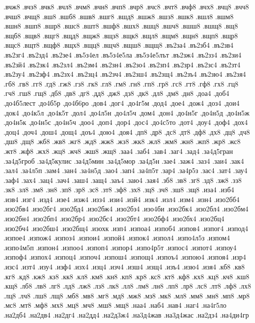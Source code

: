 {.вчж8
.вчз8
.вчк8
.вчл8
.вчм8
.вчн8
.вчп8
.вчр8
.вчс8
.вчт8
.вчф8
.вчх8
.вчц8
.вчч8
.вчш8
.вчщ8
.вш8
.вшб8
.вшв8
.вшг8
.вшд8
.вшж8
.вшз8
.вшк8
.вшл8
.вшм8
.вшн8
.вшп8
.вшр8
.вшс8
.вшт8
.вшф8
.вшх8
.вшц8
.вшч8
.вшш8
.вшщ8
.вщ8
.вщб8
.вщв8
.вщг8
.вщд8
.вщж8
.вщз8
.вщк8
.вщл8
.вщм8
.вщн8
.вщп8
.вщр8
.вщс8
.вщт8
.вщф8
.вщх8
.вщц8
.вщч8
.вщш8
.вщщ8
.въ2за4
.въ2зб4
.въ2зв4
.въ2зг4
.въ2зд4
.въ2зе4
.въ5з4ел
.въ5з4е5ла
.въ5з4е5лът
.въ2зж4
.въ2зз4
.въ2зи4
.въ2зй4
.въ2зк4
.въ2зл4
.въ2зм4
.въ2зн4
.въ2зо4
.въ2зп4
.въ2зр4
.въ2зс4
.въ2зт4
.въ2зу4
.въ2зф4
.въ2зх4
.въ2зц4
.въ2зч4
.въ2зш4
.въ2зщ4
.въ2зъ4
.въ2зю4
.въ2зя4
.гб8
.гв8
.гг8
.гд8
.гж8
.гз8
.гк8
.гл8
.гм8
.гн8
.гп8
.гр8
.гс8
.гт8
.гф8
.гх8
.гц8
.гч8
.гш8
.гщ8
.дб8
.дв8
.дг8
.дд8
.дж8
.дз8
.дк8
.дл8
.дм8
.дн8
.доа4
.доб4
.до4б5лест
.до4б5р
.до4б6ро
.дов4
.дог4
.до4г5м
.дод4
.дое4
.дож4
.доз4
.дои4
.док4
.до4к5л
.до4к5т
.дол4
.до4л5н
.до4л5ч
.дом4
.дон4
.до4н5г
.до4н5д
.до4н5ж
.до4н5к
.до4н5с
.до4н5ч
.доо4
.доп4
.дор4
.дос4
.до4с5то
.дот4
.доу4
.доф4
.дох4
.доц4
.доч4
.дош4
.дощ4
.доъ4
.дою4
.доя4
.дп8
.др8
.дс8
.дт8
.дф8
.дх8
.дц8
.дч8
.дш8
.дщ8
.жб8
.жв8
.жг8
.жд8
.жж8
.жз8
.жк8
.жл8
.жм8
.жн8
.жп8
.жр8
.жс8
.жт8
.жф8
.жх8
.жц8
.жч8
.жш8
.жщ8
.заа4
.заб4
.зав4
.заг4
.зад4
.за4д5гран
.за4д5гроб
.за4д5кулис
.за4д5мин
.за4д5мор
.за4д5н
.зае4
.заж4
.заз4
.заи4
.зак4
.зал4
.за4л5п
.зам4
.зан4
.за4н5д
.зао4
.зап4
.за4п5т
.зар4
.за4р5з
.зас4
.зат4
.зау4
.заф4
.зах4
.зац4
.зач4
.заш4
.защ4
.заъ4
.заю4
.зая4
.зб8
.зв8
.зг8
.зд8
.зж8
.зз8
.зк8
.зл8
.зм8
.зн8
.зп8
.зр8
.зс8
.зт8
.зф8
.зх8
.зц8
.зч8
.зш8
.зщ8
.иза4
.изб4
.изв4
.изг4
.изд4
.изе4
.изж4
.изз4
.изи4
.изй4
.изк4
.изл4
.изм4
.изн4
.изо2бб4
.изо2бв4
.изо2бг4
.изо2бд4
.изо2бж4
.изо2бз4
.изо4би
.изо2бк4
.изо2бл4
.изо2бм4
.изо2бн4
.изо2бп4
.изо2бр4
.изо2бс4
.изо2бт4
.изо2бф4
.изо2бх4
.изо2бц4
.изо2бч4
.изо2бш4
.изо2бщ4
.изохк
.изп4
.изпоа4
.изпоб4
.изпов4
.изпог4
.изпод4
.изпое4
.изпож4
.изпоз4
.изпои4
.изпой4
.изпок4
.изпол4
.изпо4л5з
.изпом4
.изпо4м5п
.изпон4
.изпоо4
.изпоп4
.изпор4
.изпо4р5т
.изпос4
.изпот4
.изпоу4
.изпоф4
.изпох4
.изпоц4
.изпоч4
.изпош4
.изпощ4
.изпоъ4
.изпою4
.изпоя4
.изр4
.изс4
.изт4
.изу4
.изф4
.изх4
.изц4
.изч4
.изш4
.изщ4
.изъ4
.изю4
.изя4
.кб8
.кв8
.кг8
.кд8
.кж8
.кз8
.кк8
.кл8
.км8
.кн8
.кп8
.кр8
.кс8
.кт8
.кф8
.кх8
.кц8
.кч8
.кш8
.кщ8
.лб8
.лв8
.лг8
.лд8
.лж8
.лз8
.лк8
.лл8
.лм8
.лн8
.лп8
.лр8
.лс8
.лт8
.лф8
.лх8
.лц8
.лч8
.лш8
.лщ8
.мб8
.мв8
.мг8
.мд8
.мж8
.мз8
.мк8
.мл8
.мм8
.мн8
.мп8
.мр8
.мс8
.мт8
.мф8
.мх8
.мц8
.мч8
.мш8
.мщ8
.наа4
.наб4
.нав4
.наг4
.на4г5ло
.на2дб4
.на2дв4
.на2дг4
.на2дд4
.на2д3ж4
.на3д4жав
.на3д4жас
.на2дз4
.на4ди4гр
}
